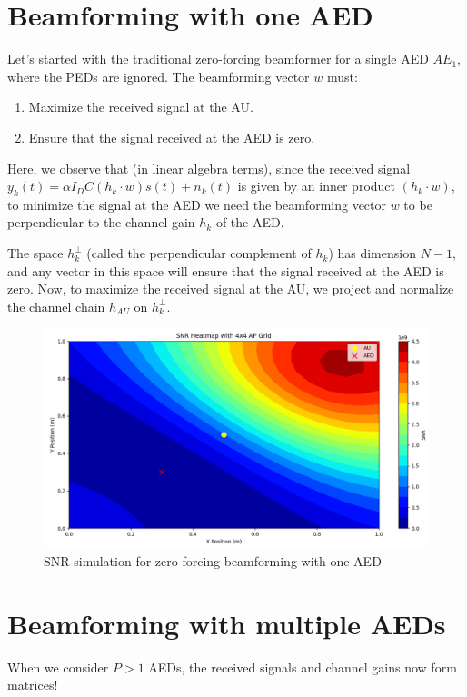 \documentclass[a4paper,12pt,twoside]{article}
\begin{document}
	\newpage
	
	\section{Beamforming with one AED}
	
	Let's started with the traditional zero-forcing beamformer for a single AED $AE_1$, where the PEDs are ignored. The beamforming vector \( w \) must:
	\begin{enumerate}
		\item Maximize the received signal at the AU.
		\item Ensure that the signal received at the AED is zero.
	\end{enumerate}
	
	Here, we observe that (in linear algebra terms), since the received signal $y_k(t) = \alpha I_DC (h_k \cdot w) s(t) + n_k(t)$ is given by an inner product $(h_k \cdot w)$, to minimize the signal at the AED we need the beamforming vector $w$ to be perpendicular to the channel gain $h_k$ of the AED.
	
	The space $h_k^\perp$ (called the perpendicular complement of $h_k$) has dimension $N-1$, and any vector in this space will ensure that the signal received at the AED is zero. Now, to maximize the received signal at the AU, we project and normalize the channel chain $h_{AU}$ on $h_k^\perp$.
	
	\begin{figure}[h!]
		\centering
		\includegraphics[width=.6\textwidth]{../oneAED.PNG}
		\caption{SNR simulation for zero-forcing beamforming with one AED}
	\end{figure}
	
	\newpage
	
	\section{Beamforming with multiple AEDs}
	
	When we consider $P>1$ AEDs, the received signals and channel gains now form matrices!
	
\end{document}
